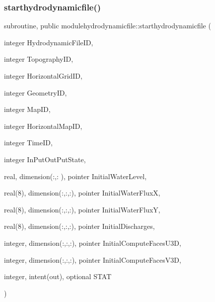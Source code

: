 \subsubsection{\texorpdfstring{starthydrodynamicfile()}{starthydrodynamicfile()}}
{\footnotesize\ttfamily subroutine, public modulehydrodynamicfile\+::starthydrodynamicfile (\begin{DoxyParamCaption}\item[{integer}]{Hydrodynamic\+File\+ID,  }\item[{integer}]{Topography\+ID,  }\item[{integer}]{Horizontal\+Grid\+ID,  }\item[{integer}]{Geometry\+ID,  }\item[{integer}]{Map\+ID,  }\item[{integer}]{Horizontal\+Map\+ID,  }\item[{integer}]{Time\+ID,  }\item[{integer}]{In\+Put\+Out\+Put\+State,  }\item[{real, dimension(\+:,\+:  ), pointer}]{Initial\+Water\+Level,  }\item[{real(8), dimension(\+:,\+:,\+:), pointer}]{Initial\+Water\+FluxX,  }\item[{real(8), dimension(\+:,\+:,\+:), pointer}]{Initial\+Water\+FluxY,  }\item[{real(8), dimension(\+:,\+:,\+:), pointer}]{Initial\+Discharges,  }\item[{integer, dimension(\+:,\+:,\+:), pointer}]{Initial\+Compute\+Faces\+U3D,  }\item[{integer, dimension(\+:,\+:,\+:), pointer}]{Initial\+Compute\+Faces\+V3D,  }\item[{integer, intent(out), optional}]{S\+T\+AT }\end{DoxyParamCaption})}

